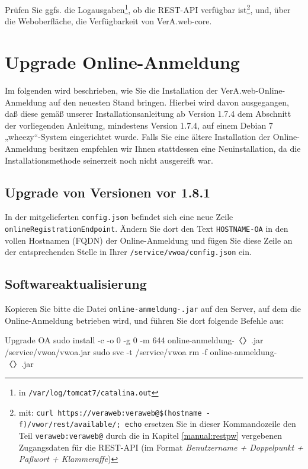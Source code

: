 Prüfen Sie ggfs. die Logausgaben\Hair\footnote{\label{fn:tomcatlogs}in
\texttt{/var/log/tomcat7/catalina.out}}, ob die REST-API verfügbar
ist\Hair\footnote{\label{fn:vworcheck}mit:
\texttt{curl https://veraweb:veraweb@\$(hostname -f)/vwor/rest/available/; echo}%
\dash ersetzen Sie in dieser Kommandozeile den Teil \texttt{veraweb:veraweb@}
durch die in Kapitel \ref{manual:restpw} vergebenen Zugangsdaten für die
REST-API (im Format {\itshape Benutzername + Doppelpunkt + Paßwort +
Klammeraffe})}, und, über die Weboberfläche, die Verfügbarkeit von
VerA.web-core.

\ifoa

\section{Upgrade Online-Anmeldung}\label{sec:upgrade-oa}

Im folgenden wird beschrieben, wie Sie die Installation der
VerA.web-Online-Anmeldung auf den neuesten Stand bringen.
Hierbei wird davon ausgegangen, daß diese gemäß
 \ifupgradeanleitung
  unserer Installationsanleitung ab Version 1.7.4
 \else%
  dem Abschnitt  der vorliegenden Anleitung,
  mindestens Version 1.7.4,
 \fi%
auf einem Debian 7 „wheezy“-System eingerichtet wurde.
Falls Sie eine ältere Installation der Online-Anmeldung besitzen
empfehlen wir Ihnen stattdessen eine Neuinstallation, da die
Installationsmethode seinerzeit noch nicht ausgereift war.

\subsection{Upgrade von Versionen vor 1.8.1}\label{subsec:upgrade-oa-181}

In der mitgelieferten \texttt{config.json} befindet sich eine neue
Zeile \texttt{onlineRegistrationEndpoint}. Ändern Sie dort den Text
\texttt{HOSTNAME-OA} in den vollen Hostnamen (FQDN) der Online-Anmeldung
und fügen Sie diese Zeile an der entsprechenden Stelle in Ihrer
\texttt{/service/vwoa/config.json} ein.

\subsection{Softwareaktualisierung}\label{subsec:upgrade-oa-software}

\begin{minipage}{\textwidth}
Kopieren Sie bitte die Datei \texttt{online-anmeldung-\vwiaverssw{}.jar}
auf den Server, auf dem die Online-Anmeldung betrieben wird, und führen
Sie dort folgende Befehle aus:

\begin{lstdump}{Upgrade OA}
sudo install -c -o 0 -g 0 -m 644 online-anmeldung-〈\lstdumpesc{\vwiaverssw}〉.jar /service/vwoa/vwoa.jar
sudo svc -t /service/vwoa
rm -f online-anmeldung-〈\lstdumpesc{\vwiaverssw}〉.jar
\end{lstdump}
\end{minipage}

